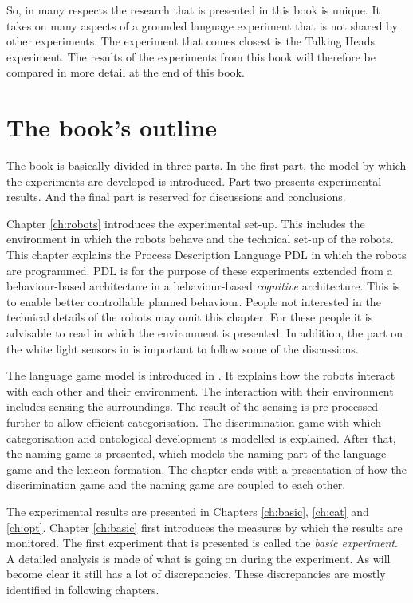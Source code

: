 So, in many respects the research that is presented in this book is unique. It takes on many aspects of a grounded language experiment that is not shared by other experiments. The experiment that comes closest is the Talking Heads experiment. The results of the experiments from this book will therefore be compared in more detail at the end of this book.


\section{The book's outline}

The book is basically divided in three parts. In the first part, the model by which the experiments are developed is introduced. Part two presents experimental results. And the final part is reserved for discussions and conclusions.


Chapter \ref{ch:robots} introduces the experimental set-up. This includes the environment in which the robots behave and the technical set-up of the robots. This chapter explains the Process Description Language PDL in which the robots are programmed. PDL is for the purpose of these experiments extended from a behaviour-based architecture in a behaviour-based {\em cognitive} architecture. This is to enable better controllable planned behaviour. People not interested in the technical details of the robots may omit this chapter. For these people it is advisable to read  in which the environment is presented. In addition, the part on the white light sensors in  is important to follow some of the discussions.

The language game model is introduced in . It explains how the robots interact with each other and their environment. The interaction with their environment includes sensing the surroundings. The result of the sensing is pre-processed further to allow efficient categorisation. The discrimination game with which categorisation and ontological development is modelled is explained. After that, the naming game is presented, which models the naming part of the language game and the lexicon formation. The chapter ends with a presentation of how the discrimination game and the naming game are coupled to each other.


The experimental results are presented in Chapters \ref{ch:basic}, \ref{ch:cat} and \ref{ch:opt}. Chapter \ref{ch:basic} first introduces the measures by which the results are monitored. The first experiment that is presented is called the {\em basic experiment}. A detailed analysis is made of what is going on during the experiment. As will become clear it still has a lot of discrepancies. These discrepancies are mostly identified in following chapters. 


